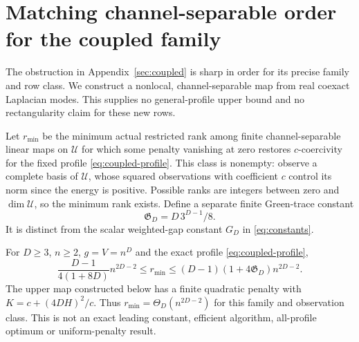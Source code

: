 \section{Matching channel-separable order for the coupled family}\label{sec:matching-modes}
The obstruction in Appendix~\ref{sec:coupled} is sharp in order for its
precise family and row class. We construct a nonlocal, channel-separable
map from real coexact Laplacian modes. This supplies no general-profile
upper bound and no rectangularity claim for these new rows.

Let $r_{\min}$ be the minimum actual restricted rank among finite
channel-separable linear maps on $\mathcal U$ for which some penalty
vanishing at zero restores $c$-coercivity for the fixed profile
\eqref{eq:coupled-profile}. This class is nonempty: observe a complete
basis of $\mathcal U$, whose squared observations with coefficient $c$
control its norm since the energy is positive. Possible ranks are
integers between zero and $\dim\mathcal U$, so the minimum rank exists.
Define a separate finite Green-trace constant
\begin{equation}\label{eq:green-constant}
 \mathfrak G_D=D\,3^{D-1}/8.
\end{equation}
It is distinct from the scalar weighted-gap constant $G_D$ in
\eqref{eq:constants}.

\begin{theorem}\label{thm:matching-modes}
For $D\ge3$, $n\ge2$, $g=V=n^D$ and the exact profile
\eqref{eq:coupled-profile},
\begin{equation}\label{eq:matching-order}
 \frac{D-1}{4(1+8D)}n^{2D-2}
 \le r_{\min}\le (D-1)(1+4\mathfrak G_D)n^{2D-2}.
\end{equation}
The upper map constructed below has a finite quadratic penalty with
$K=c+(4DH)^2/c$. Thus $r_{\min}=\Theta_D(n^{2D-2})$ for this family
and observation class. This is not an exact leading constant, efficient
algorithm, all-profile optimum or uniform-penalty result.
\end{theorem}

